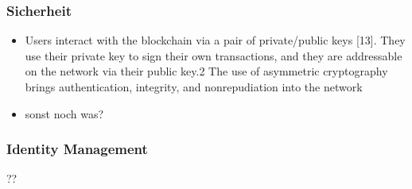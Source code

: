     \subsubsection{Sicherheit}
    \label{sec:sota_blockchain_security}
        \begin{itemize}
            \item Users interact with the blockchain via a pair of private/public keys [13]. They use their private key to sign their own transactions, and they are addressable on the network via their public key.2 The use of asymmetric cryptography brings authentication, integrity, and nonrepudiation into the network\cite{Christidis2016}
            \item sonst noch was?
        \end{itemize}
    
    \subsubsection{Identity Management}
    \label{sec:sota_blockchain_identitymgmnt}
        ??
